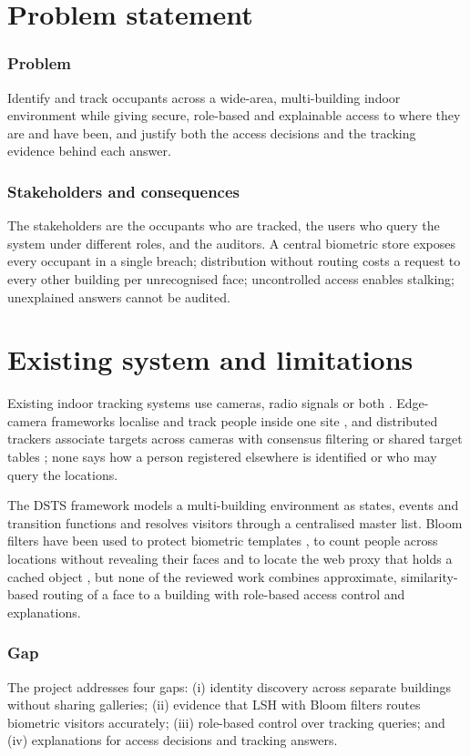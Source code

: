 \documentclass[12pt,a4paper,oneside]{report}
\begin{document}
\section{Problem statement}
\subsubsection{Problem}
Identify and track occupants across a wide-area, multi-building indoor environment while giving secure, role-based and explainable access to where they are and have been, and justify both the access decisions and the tracking evidence behind each answer.

\subsubsection{Stakeholders and consequences}
The stakeholders are the occupants who are tracked, the users who query the system under different roles, and the auditors. A central biometric store exposes every occupant in a single breach; distribution without routing costs a request to every other building per unrecognised face; uncontrolled access enables stalking; unexplained answers cannot be audited.

\section{Existing system and limitations}
Existing indoor tracking systems use cameras, radio signals or both \cite{ref1,ref2,ref9}. Edge-camera frameworks localise and track people inside one site \cite{ref1,ref2,ref5}, and distributed trackers associate targets across cameras with consensus filtering or shared target tables \cite{ref3,ref4}; none says how a person registered elsewhere is identified or who may query the locations.

The DSTS framework \cite{ref6} models a multi-building environment as states, events and transition functions and resolves visitors through a centralised master list. Bloom filters have been used to protect biometric templates \cite{ref10}, to count people across locations without revealing their faces \cite{ref11} and to locate the web proxy that holds a cached object \cite{ref13}, but none of the reviewed work combines approximate, similarity-based routing of a face to a building with role-based access control and explanations.

\subsubsection{Gap}
The project addresses four gaps: (i) identity discovery across separate buildings without sharing galleries; (ii) evidence that LSH with Bloom filters routes biometric visitors accurately; (iii) role-based control over tracking queries; and (iv) explanations for access decisions and tracking answers.
\end{document}
